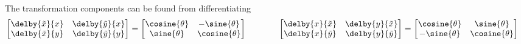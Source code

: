 The transformation components can be found from differentiating
\ie
\begin{equation}
  \begin{aligned}
    \begin{bmatrix}
      \delby{\tilde{x}}{x} & \delby{\tilde{y}}{x} \\
      \delby{\tilde{x}}{y} & \delby{\tilde{y}}{y}
    \end{bmatrix} &=
    \begin{bmatrix}
      \cosine{\theta} & -\sine{\theta} \\
      \sine{\theta} & \cosine{\theta}
    \end{bmatrix} &\qquad&&
    \begin{bmatrix}
      \delby{x}{\tilde{x}} & \delby{y}{\tilde{x}} \\
      \delby{x}{\tilde{y}} & \delby{y}{\tilde{y}}
    \end{bmatrix}&=
    \begin{bmatrix}
      \cosine{\theta} & \sine{\theta} \\
      -\sine{\theta} & \cosine{\theta}
    \end{bmatrix}
  \end{aligned}
\end{equation}

